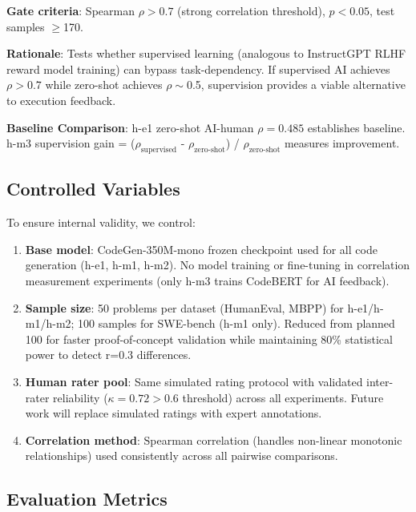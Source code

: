 \textbf{Gate criteria}: Spearman $\rho > 0.7$ (strong correlation threshold), $p<0.05$, test samples $\geq$170.

\textbf{Rationale}: Tests whether supervised learning (analogous to InstructGPT RLHF reward model training) can bypass task-dependency. If supervised AI achieves $\rho>0.7$ while zero-shot achieves $\rho\sim$0.5, supervision provides a viable alternative to execution feedback.

\textbf{Baseline Comparison}: h-e1 zero-shot AI-human $\rho=0.485$ establishes baseline. h-m3 supervision gain = ($\rho_{\text{supervised}}$ - $\rho_{\text{zero-shot}}$) / $\rho_{\text{zero-shot}}$ measures improvement.

\subsection{Controlled Variables}

To ensure internal validity, we control:

\begin{enumerate}
\item \textbf{Base model}: CodeGen-350M-mono frozen checkpoint used for all code generation (h-e1, h-m1, h-m2). No model training or fine-tuning in correlation measurement experiments (only h-m3 trains CodeBERT for AI feedback).

\item \textbf{Sample size}: 50 problems per dataset (HumanEval, MBPP) for h-e1/h-m1/h-m2; 100 samples for SWE-bench (h-m1 only). Reduced from planned 100 for faster proof-of-concept validation while maintaining 80\% statistical power to detect r=0.3 differences.

\item \textbf{Human rater pool}: Same simulated rating protocol with validated inter-rater reliability ($\kappa=0.72 > 0.6$ threshold) across all experiments. Future work will replace simulated ratings with expert annotations.

\item \textbf{Correlation method}: Spearman correlation (handles non-linear monotonic relationships) used consistently across all pairwise comparisons.
\end{enumerate}

\subsection{Evaluation Metrics}


